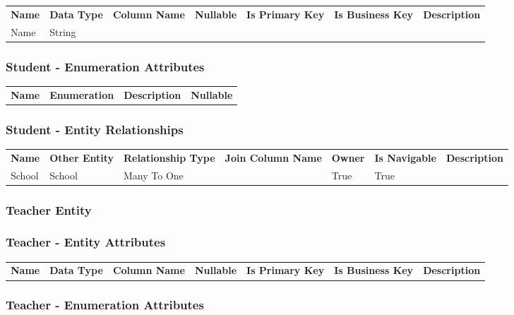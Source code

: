 \begin{tabular}{lllcccl}
\bfseries Name & \bfseries Data Type & \bfseries Column Name & \bfseries Nullable & \bfseries Is Primary Key & \bfseries Is Business Key & \bfseries Description\\
Name & String &  &  &  &  &  \\
\end{tabular}

\subsubsection*{ Student - Enumeration Attributes}

\begin{tabular}{lcp{6.0cm}c}
\bfseries Name & \bfseries Enumeration & \bfseries Description & \bfseries Nullable \\
\end{tabular}

\subsubsection*{ Student - Entity Relationships}

\begin{tabular}{llllllp{2.0cm}}
\bfseries Name & \bfseries Other Entity & \bfseries Relationship Type & \bfseries Join Column Name & \bfseries Owner & \bfseries Is Navigable & \bfseries Description\\
School & School & Many To One &  & True & True & \\
\end{tabular}


\subsubsection{ Teacher Entity }

\subsubsection*{ Teacher - Entity Attributes }

\begin{tabular}{lllcccl}
\bfseries Name & \bfseries Data Type & \bfseries Column Name & \bfseries Nullable & \bfseries Is Primary Key & \bfseries Is Business Key & \bfseries Description\\
\end{tabular}

\subsubsection*{ Teacher - Enumeration Attributes}

